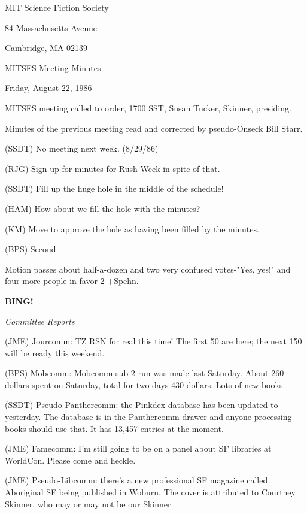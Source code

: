 \documentclass[12pt]{article}
\newcommand{\bing}{{\bf BING!} }
\newcommand{\goto}[1]{\bing \vskip 12pt \centerline{{\em{#1}}}}
\begin{document}
\begin{center}

MIT Science Fiction Society 

84 Massachusetts Avenue

Cambridge, MA 02139

\vspace{12pt}

MITSFS Meeting Minutes 

Friday, August 22, 1986

\end{center}
 
\vspace{18pt}

\setlength{\parskip}{6pt}

\noindent
MITSFS meeting called to order, 1700 SST,
Susan Tucker, Skinner, presiding.

Minutes of the previous meeting read and corrected by pseudo-Onseck Bill Starr.

(SSDT) No meeting next week. (8/29/86)

(RJG) Sign up for minutes for Rush Week in spite of that.

(SSDT) Fill up the huge hole in the middle of the schedule!

(HAM) How about we fill the hole with the minutes?

(KM) Move to approve the hole as having been filled by the minutes.

(BPS) Second.

Motion passes about half-a-dozen and two very confused votes-"Yes, yes!" and four more people in favor-2 +Spehn.

\goto{Committee Reports}

(JME) Jourcomm: TZ RSN for real this time! The first 50 are here; the next 150 will be ready this weekend.

(BPS) Mobcomm: Mobcomm sub 2 run was made last Saturday. About 260 dollars spent on Saturday, total for two days 430 dollars. Lots of new books.

(SSDT) Pseudo-Panthercomm: the Pinkdex database has been updated to yesterday. The database is in the Panthercomm drawer and anyone processing books should use that. It has 13,457 entries at the moment.

(JME) Famecomm: I'm still going to be on a panel about SF libraries at WorldCon. Please come and heckle.

(JME) Pseudo-Libcomm: there's a new professional SF magazine called Aboriginal SF being published in Woburn. The cover is attributed to Courtney Skinner, who may or may not be our Skinner.
\end{document}
